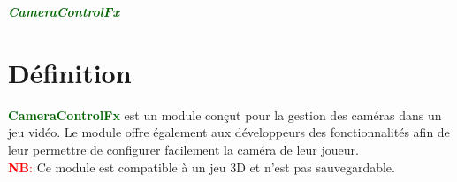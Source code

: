\documentclass[a4paper, 11pt]{article}
\begin{document}
	\pagecolor{silver}
	\huge{\hspace{12.5cm}\textit{\textbf{\textcolor{darkgreen}{CameraControlFx}}}}\large{} \tableofcontents
	\newpage
	\section{Définition}
	\textcolor{darkgreen}{\textbf{CameraControlFx}} est un module conçut pour la gestion des caméras dans un
	jeu vidéo. Le module offre également aux développeurs des fonctionnalités afin de leur permettre de 
	configurer facilement la caméra de leur joueur.\\
	\textcolor{red}{\textbf{NB}:} Ce module est compatible à un jeu 3D et n'est pas sauvegardable.

\end{document}
